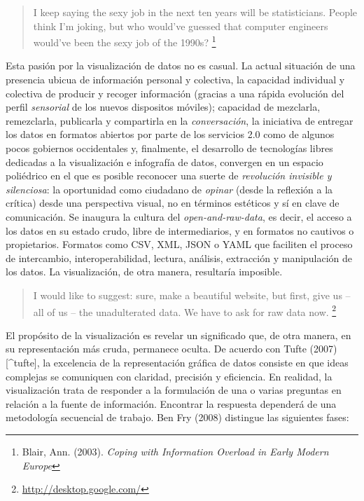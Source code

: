 \documentclass[12pt, a4paper,twoside]{book}
\begin{document}
\begin{quote}
I keep saying the sexy job in the next ten years will be
statisticians. People think I'm joking, but who would've guessed
that computer engineers would've been the sexy job of the 1990s?%
\footnote{Blair, Ann. (2003).
\emph{Coping with Information Overload in Early Modern Europe}}

\end{quote}
Esta pasión por la visualización de datos no es casual. La actual
situación de una presencia ubicua de información personal y
colectiva, la capacidad individual y colectiva de producir y
recoger información (gracias a una rápida evolución del perfil
\emph{sensorial} de los nuevos dispositos móviles); capacidad de
mezclarla, remezclarla, publicarla y compartirla en la
\emph{conversación}, la iniciativa de entregar los datos en
formatos abiertos por parte de los servicios 2.0 como de algunos
pocos gobiernos occidentales y, finalmente, el desarrollo de
tecnologías libres dedicadas a la visualización e infografía de
datos, convergen en un espacio poliédrico en el que es posible
reconocer una suerte de \emph{revolución invisible y silenciosa}:
la oportunidad como ciudadano de \emph{opinar} (desde la reflexión
a la crítica) desde una perspectiva visual, no en términos
estéticos y sí en clave de comunicación. Se inaugura la cultura del
\emph{open-and-raw-data}, es decir, el acceso a los datos en su
estado crudo, libre de intermediarios, y en formatos no cautivos o
propietarios. Formatos como CSV, XML, JSON o YAML que faciliten el
proceso de intercambio, interoperabilidad, lectura, análisis,
extracción y manipulación de los datos. La visualización, de otra
manera, resultaría imposible.

\begin{quote}
I would like to suggest: sure, make a beautiful website, but first,
give us – all of us – the unadulterated data. We have to ask for
raw data now.%
\footnote{\href{http://desktop.google.com/}{http://desktop.google.com/}}

\end{quote}
El propósito de la visualización es revelar un significado que, de
otra manera, en su representación más cruda, permanece oculta. De
acuerdo con Tufte (2007)[\^{}tufte], la excelencia de la
representación gráfica de datos consiste en que ideas complejas se
comuniquen con claridad, precisión y eficiencia. En realidad, la
visualización trata de responder a la formulación de una o varias
preguntas en relación a la fuente de información. Encontrar la
respuesta dependerá de una metodología secuencial de trabajo. Ben
Fry (2008) distingue las siguientes fases:
\end{document}
